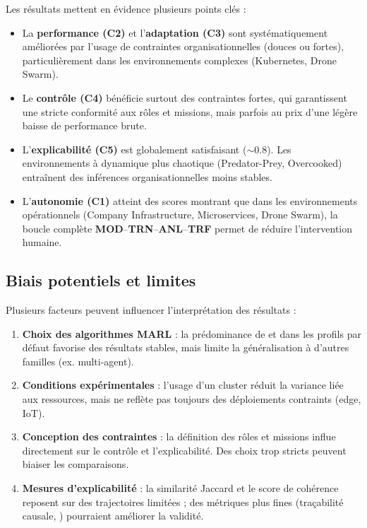 Les résultats mettent en évidence plusieurs points clés :
\begin{itemize}
  \item La \textbf{performance (C2)} et l'\textbf{adaptation (C3)} sont systématiquement améliorées par l'usage de contraintes organisationnelles (douces ou fortes), particulièrement dans les environnements complexes (Kubernetes, Drone Swarm).
  \item Le \textbf{contrôle (C4)} bénéficie surtout des contraintes fortes, qui garantissent une stricte conformité aux rôles et missions, mais parfois au prix d'une légère baisse de performance brute.
  \item L'\textbf{explicabilité (C5)} est globalement satisfaisant ($\sim 0.8$). Les environnements à dynamique plus chaotique (Predator-Prey, Overcooked) entraînent des inférences organisationnelles moins stables.
  \item L'\textbf{autonomie (C1)} atteint des scores montrant que dans les environnements opérationnels (Company Infrastructure, Microservices, Drone Swarm), la boucle complète \textbf{MOD}–\textbf{TRN}–\textbf{ANL}–\textbf{TRF} permet de réduire l'intervention humaine.
\end{itemize}

\subsection{Biais potentiels et limites}

Plusieurs facteurs peuvent influencer l'interprétation des résultats :
\begin{enumerate}[label={\alph*)}]
  \item \textbf{Choix des algorithmes MARL} : la prédominance de  et  dans les profils par défaut favorise des résultats stables, mais limite la généralisation à d'autres familles (ex.  multi-agent).
  \item \textbf{Conditions expérimentales} : l'usage d'un cluster  réduit la variance liée aux ressources, mais ne reflète pas toujours des déploiements contraints (edge, IoT).
  \item \textbf{Conception des contraintes} : la définition des rôles et missions influe directement sur le contrôle et l'explicabilité. Des choix trop stricts peuvent biaiser les comparaisons.
  \item \textbf{Mesures d'explicabilité} : la similarité Jaccard et le score de cohérence reposent sur des trajectoires limitées ; des métriques plus fines (traçabilité causale, ) pourraient améliorer la validité.
\end{enumerate}

